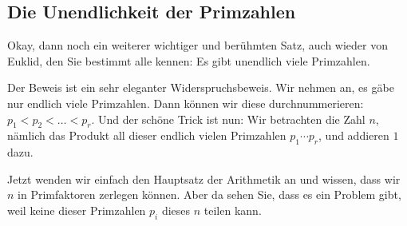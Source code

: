 \begin{math-stroke}
\end{math-stroke}

\subsection{Die Unendlichkeit der Primzahlen}

\begin{spoken-clean}[01:03:42 - 01:05:53]
Okay, dann noch ein weiterer wichtiger und berühmten Satz, auch wieder von Euklid, den Sie bestimmt alle kennen: Es gibt unendlich viele Primzahlen.

Der Beweis ist ein sehr eleganter Widerspruchsbeweis. Wir nehmen an, es gäbe nur endlich viele Primzahlen. Dann können wir diese durchnummerieren: $p_1 < p_2 < \dots < p_r$. Und der schöne Trick ist nun: Wir betrachten die Zahl $n$, nämlich das Produkt all dieser endlich vielen Primzahlen $p_1 \cdots p_r$, und addieren $1$ dazu.

Jetzt wenden wir einfach den Hauptsatz der Arithmetik an und wissen, dass wir $n$ in Primfaktoren zerlegen können. Aber da sehen Sie, dass es ein Problem gibt, weil keine dieser Primzahlen $p_i$ dieses $n$ teilen kann.
\end{spoken-clean}

\begin{math-stroke}
\end{math-stroke}

